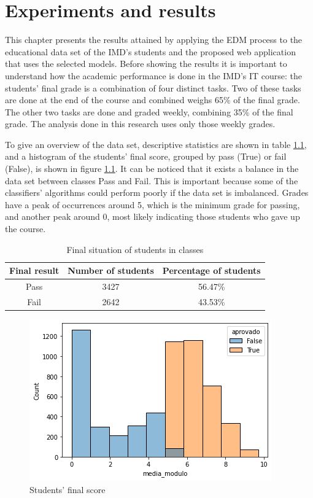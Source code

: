 \chapter{Experiments and results}
\label{ch:Experiments}

This chapter presents the results attained by applying the EDM process to the educational data set of the IMD's students and the proposed web application that uses the selected models. Before showing the results it is important to understand how the academic performance is done in the IMD's IT course: the students' final grade is a combination of four distinct tasks. Two of these tasks are done at the end of the course and combined weighs 65\% of the final grade. The other two tasks are done and graded weekly, combining 35\% of the final grade. The analysis done in this research uses only those weekly grades.

To give an overview of the data set, descriptive statistics are shown in table \ref{tab:da}, and a histogram of the students' final score, grouped by pass (True) or fail (False), is shown in figure \ref{fig:mm}. It can be noticed that it exists a balance in the data set between classes Pass and Fail. This is important because some of the classifiers' algorithms could perform poorly if the data set is imbalanced. Grades have a peak of occurrences around 5, which is the minimum grade for passing, and another peak around 0, most likely indicating those students who gave up the course.

\begin{table}[ht]
\centering
\begin{tabular}{ccc} \hline
\textbf{Final result} & \textbf{Number of students} & \textbf{Percentage of students} \\ \hline
Pass                  & 3427                        & 56.47\%                         \\
Fail                  & 2642                        & 43.53\%                         \\ \hline
\end{tabular}   
\caption{Final situation of students in classes}
\label{tab:da}
\end{table}

\begin{figure}[htb]
	\centering
  	\includegraphics[scale=.5]{Resultados/mm.png}
  	\caption{Students' final score}
  	\label{fig:mm}
\end{figure}

